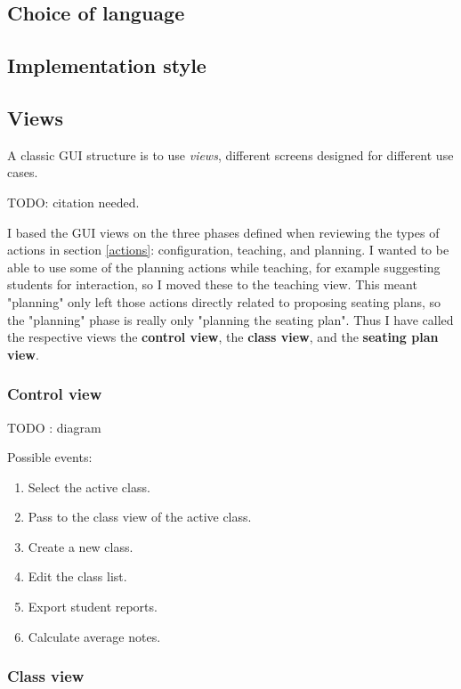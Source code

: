 \documentclass[10pt]{article}
\begin{document}
\subsection{Choice of language}

\subsection{Implementation style}

\subsection{Views}
A classic GUI structure is to use \emph{views}, different screens designed for different use cases.
 
TODO: citation needed.

I based the GUI views on the three phases defined when reviewing the types of actions in section \ref{actions}: configuration, teaching, and planning. I wanted to be able to use some of the planning actions while teaching, for example suggesting students for interaction, so I moved these to the teaching view. This meant "planning" only left those actions directly related to proposing seating plans, so the "planning" phase is really only "planning the seating plan". Thus I have called the respective views the \textbf{control view}, the \textbf{class view}, and the \textbf{seating plan view}.

\subsubsection{Control view}

TODO : diagram

Possible events: 
\begin{enumerate}
\item Select the active class.
\item Pass to the class view of the active class.
\item Create a new class.
\item Edit the class list.
\item Export student reports.
\item Calculate average notes.
\end{enumerate}

\subsubsection{Class view}
\end{document}
